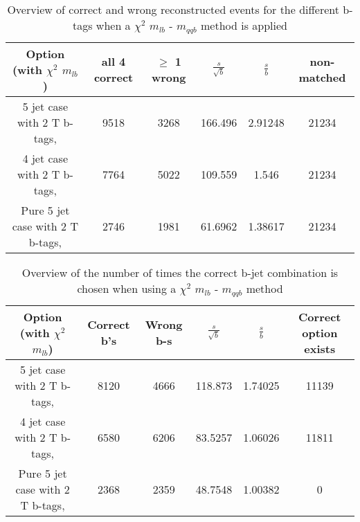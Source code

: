 \begin{table}[!h] 
 \begin{tabular}{c|c|c|c|c|c} 
 \textbf{Option} (with $\chi^{2}$ $m_{lb}$) & all 4 correct      & $\geq$ 1 wrong  & $\frac{s}{\sqrt{b}}$ & $\frac{s}{b}$ & non-matched \\ \hline 
 5 jet case with      2 T b-tags,              & 9518 & 3268 & 166.496 & 2.91248 & 21234 \\ 
 4 jet case with      2 T b-tags,              & 7764 & 5022 & 109.559 & 1.546 & 21234 \\ 
 Pure 5 jet case with 2 T b-tags,              & 2746 & 1981 & 61.6962 & 1.38617 & 21234 \\ 
 \end{tabular} 
 \caption{Overview of correct and wrong reconstructed events for the different b-tags when a $\chi^{2}$ $m_{lb}$ - $m_{qqb}$ method is applied} 
 \end{table} 
 
 \begin{table}[!h] 
 \begin{tabular}{c|c|c|c|c|c} 
 \textbf{Option} (with $\chi^{2}$ $m_{lb}$) & Correct b's & Wrong b-s & $\frac{s}{\sqrt{b}}$ & $\frac{s}{b}$ & Correct option exists \\ \hline 
 5 jet case with      2 T b-tags,              & 8120 & 4666 & 118.873 & 1.74025 & 11139 \\ 
 4 jet case with      2 T b-tags,              & 6580 & 6206 & 83.5257 & 1.06026 & 11811 \\ 
 Pure 5 jet case with 2 T b-tags,              & 2368 & 2359 & 48.7548 & 1.00382 & 0 \\ 
 \end{tabular} 
 \caption{Overview of the number of times the correct b-jet combination is chosen when using a $\chi^{2}$ $m_{lb}$ - $m_{qqb}$ method} 
 \end{table} 
 
